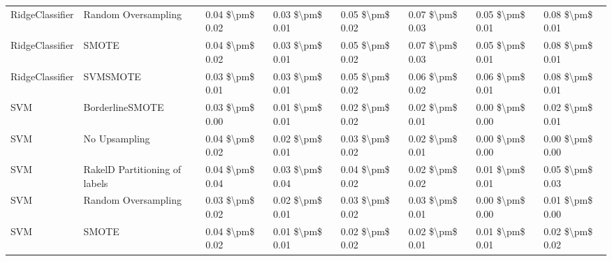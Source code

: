 \begin{tabular}{llllllll}
                RidgeClassifier &           Random Oversampling & 0.04 \$\textbackslash pm\$ 0.02 &           0.03 \$\textbackslash pm\$ 0.01 &       0.05 \$\textbackslash pm\$ 0.02 &        0.07 \$\textbackslash pm\$ 0.03 &                         0.05 \$\textbackslash pm\$ 0.01 &     0.08 \$\textbackslash pm\$ 0.01 \\
                RidgeClassifier &                         SMOTE & 0.04 \$\textbackslash pm\$ 0.02 &           0.03 \$\textbackslash pm\$ 0.01 &       0.05 \$\textbackslash pm\$ 0.02 &        0.07 \$\textbackslash pm\$ 0.03 &                         0.05 \$\textbackslash pm\$ 0.01 &     0.08 \$\textbackslash pm\$ 0.01 \\
                RidgeClassifier &                      SVMSMOTE & 0.03 \$\textbackslash pm\$ 0.01 &           0.03 \$\textbackslash pm\$ 0.01 &       0.05 \$\textbackslash pm\$ 0.02 &        0.06 \$\textbackslash pm\$ 0.02 &                         0.06 \$\textbackslash pm\$ 0.01 &     0.08 \$\textbackslash pm\$ 0.01 \\
                            SVM &               BorderlineSMOTE & 0.03 \$\textbackslash pm\$ 0.00 &           0.01 \$\textbackslash pm\$ 0.01 &       0.02 \$\textbackslash pm\$ 0.02 &        0.02 \$\textbackslash pm\$ 0.01 &                         0.00 \$\textbackslash pm\$ 0.00 &     0.02 \$\textbackslash pm\$ 0.01 \\
                            SVM &                 No Upsampling & 0.04 \$\textbackslash pm\$ 0.02 &           0.02 \$\textbackslash pm\$ 0.01 &       0.03 \$\textbackslash pm\$ 0.02 &        0.02 \$\textbackslash pm\$ 0.01 &                         0.00 \$\textbackslash pm\$ 0.00 &     0.00 \$\textbackslash pm\$ 0.00 \\
                            SVM & RakelD Partitioning of labels & 0.04 \$\textbackslash pm\$ 0.04 &           0.03 \$\textbackslash pm\$ 0.04 &       0.04 \$\textbackslash pm\$ 0.02 &        0.02 \$\textbackslash pm\$ 0.02 &                         0.01 \$\textbackslash pm\$ 0.01 &     0.05 \$\textbackslash pm\$ 0.03 \\
                            SVM &           Random Oversampling & 0.03 \$\textbackslash pm\$ 0.02 &           0.02 \$\textbackslash pm\$ 0.01 &       0.03 \$\textbackslash pm\$ 0.02 &        0.03 \$\textbackslash pm\$ 0.01 &                         0.00 \$\textbackslash pm\$ 0.00 &     0.01 \$\textbackslash pm\$ 0.00 \\
                            SVM &                         SMOTE & 0.04 \$\textbackslash pm\$ 0.02 &           0.01 \$\textbackslash pm\$ 0.01 &       0.02 \$\textbackslash pm\$ 0.02 &        0.02 \$\textbackslash pm\$ 0.01 &                         0.01 \$\textbackslash pm\$ 0.01 &     0.02 \$\textbackslash pm\$ 0.02 \\

\end{tabular}
